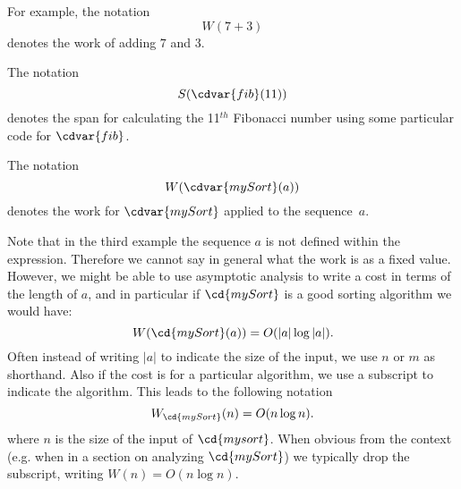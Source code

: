 \begin{example}
For example, 
the notation
\[
W(7 + 3)
\]
denotes the work of adding $7$ and $3$.

The notation 
\[
S(\cdvar{fib}(11))
\]
denotes the span for calculating the 11$^{th}$ Fibonacci number using
some particular code for $\cdvar{fib}$.

The notation 
\[
W(\cdvar{mySort}(a))
\]
denotes the work for $\cdvar{mySort}$ applied to the sequence~$a$.
\end{example}


\begin{gram}
Note that in the third example the sequence $a$ is not defined within
the expression.  Therefore we cannot say in general what the work is
as a fixed value.  However, we might be able to use asymptotic
analysis to write a cost in terms of the length of $a$, and in
particular if $\cd{mySort}$ is a good sorting algorithm we would have:
\[
W(\cd{mySort}(a)) = O(|a| \log |a|).
\]
Often instead of writing  $|a|$ to indicate the size of the input, we
use $n$ or $m$ as shorthand.  Also if the cost is for a particular
algorithm, we use a subscript to indicate the algorithm. This leads to
the following notation
\[
W_{\cd{mySort}}(n) = O(n \log n).
\]
where $n$ is the size of the input of $\cd{mysort}$.  When obvious
from the context (e.g. when in a section on analyzing $\cd{mySort}$)
we typically drop the subscript, writing $W(n) = O(n \log n)$.
\end{gram}

